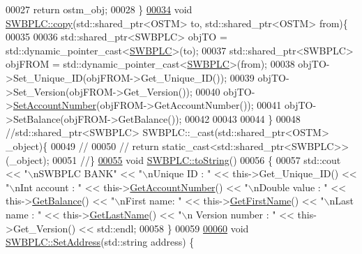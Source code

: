 \begin{DoxyCode}
00027     \textcolor{keywordflow}{return} ostm\_obj;
00028 \}
\hypertarget{_s_w_b_p_l_c_8cpp_source.tex_l00034}{}\hyperlink{class_s_w_b_p_l_c_a9468640482a6cfb9bfb4115fc59191d5}{00034} \textcolor{keywordtype}{void} \hyperlink{class_s_w_b_p_l_c_a9468640482a6cfb9bfb4115fc59191d5}{SWBPLC::copy}(std::shared\_ptr<OSTM> to, std::shared\_ptr<OSTM> from)\{
00035 
00036     std::shared\_ptr<SWBPLC> objTO = std::dynamic\_pointer\_cast<\hyperlink{class_s_w_b_p_l_c}{SWBPLC}>(to);
00037     std::shared\_ptr<SWBPLC> objFROM = std::dynamic\_pointer\_cast<\hyperlink{class_s_w_b_p_l_c}{SWBPLC}>(from);
00038     objTO->Set\_Unique\_ID(objFROM->Get\_Unique\_ID());
00039     objTO->Set\_Version(objFROM->Get\_Version());
00040     objTO->\hyperlink{class_s_w_b_p_l_c_a45eb1e6a73fde0dc00824319d4e0b81a}{SetAccountNumber}(objFROM->GetAccountNumber());
00041     objTO->SetBalance(objFROM->GetBalance());
00042 
00043     
00044 \}
00048 \textcolor{comment}{//std::shared\_ptr<SWBPLC> SWBPLC::\_cast(std::shared\_ptr<OSTM> \_object)\{}
00049 \textcolor{comment}{//}
00050 \textcolor{comment}{//    return static\_cast<std::shared\_ptr<SWBPLC>>(\_object);}
00051 \textcolor{comment}{//\}}
\hypertarget{_s_w_b_p_l_c_8cpp_source.tex_l00055}{}\hyperlink{class_s_w_b_p_l_c_a761c77b5a204b4ae05ffb01bd602c3c2}{00055} \textcolor{comment}{}\textcolor{keywordtype}{void} \hyperlink{class_s_w_b_p_l_c_a761c77b5a204b4ae05ffb01bd602c3c2}{SWBPLC::toString}()
00056 \{
00057      std::cout << \textcolor{stringliteral}{"\(\backslash\)nSWBPLC BANK"} << \textcolor{stringliteral}{"\(\backslash\)nUnique ID : "} << this->Get\_Unique\_ID() << \textcolor{stringliteral}{"\(\backslash\)nInt account : "} << 
      this->\hyperlink{class_s_w_b_p_l_c_a1a997f6d333e5021970e50605431d7df}{GetAccountNumber}() << \textcolor{stringliteral}{"\(\backslash\)nDouble value : "} << this->\hyperlink{class_s_w_b_p_l_c_af7f5f662ab926bfb9c0c1c7156cde24c}{GetBalance}() << \textcolor{stringliteral}{"\(\backslash\)nFirst
       name: "} << this->\hyperlink{class_s_w_b_p_l_c_ace6bbcd6546896e581e3a2ee9504d090}{GetFirstName}() << \textcolor{stringliteral}{"\(\backslash\)nLast name : "} << this->\hyperlink{class_s_w_b_p_l_c_a72b2595acea28dae9e4f5816dd3c4652}{GetLastName}()  << \textcolor{stringliteral}{"\(\backslash\)n
      Version number : "} << this->Get\_Version() << std::endl;
00058 \}
00059 
\hypertarget{_s_w_b_p_l_c_8cpp_source.tex_l00060}{}\hyperlink{class_s_w_b_p_l_c_a99590e47dda8361b2d5869fd315f92f8}{00060} \textcolor{keywordtype}{void} \hyperlink{class_s_w_b_p_l_c_a99590e47dda8361b2d5869fd315f92f8}{SWBPLC::SetAddress}(std::string address) \{

\end{DoxyCode}
